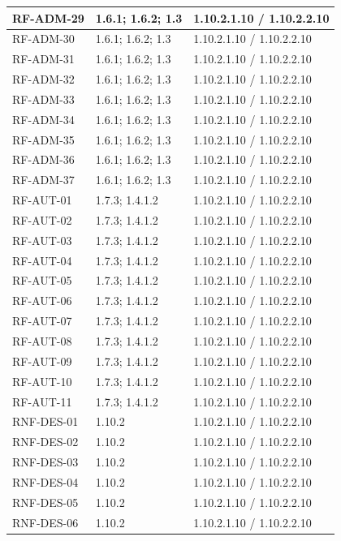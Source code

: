 \begin{longtable}{L{23mm}L{46mm}L{72mm}}
RF-ADM-29 & 1.6.1; 1.6.2; 1.3 & 1.10.2.1.10 / 1.10.2.2.10\\\hline
RF-ADM-30 & 1.6.1; 1.6.2; 1.3 & 1.10.2.1.10 / 1.10.2.2.10\\\hline
RF-ADM-31 & 1.6.1; 1.6.2; 1.3 & 1.10.2.1.10 / 1.10.2.2.10\\\hline
RF-ADM-32 & 1.6.1; 1.6.2; 1.3 & 1.10.2.1.10 / 1.10.2.2.10\\\hline
RF-ADM-33 & 1.6.1; 1.6.2; 1.3 & 1.10.2.1.10 / 1.10.2.2.10\\\hline
RF-ADM-34 & 1.6.1; 1.6.2; 1.3 & 1.10.2.1.10 / 1.10.2.2.10\\\hline
RF-ADM-35 & 1.6.1; 1.6.2; 1.3 & 1.10.2.1.10 / 1.10.2.2.10\\\hline
RF-ADM-36 & 1.6.1; 1.6.2; 1.3 & 1.10.2.1.10 / 1.10.2.2.10\\\hline
RF-ADM-37 & 1.6.1; 1.6.2; 1.3 & 1.10.2.1.10 / 1.10.2.2.10\\\hline
RF-AUT-01 & 1.7.3; 1.4.1.2 & 1.10.2.1.10 / 1.10.2.2.10\\\hline
RF-AUT-02 & 1.7.3; 1.4.1.2 & 1.10.2.1.10 / 1.10.2.2.10\\\hline
RF-AUT-03 & 1.7.3; 1.4.1.2 & 1.10.2.1.10 / 1.10.2.2.10\\\hline
RF-AUT-04 & 1.7.3; 1.4.1.2 & 1.10.2.1.10 / 1.10.2.2.10\\\hline
RF-AUT-05 & 1.7.3; 1.4.1.2 & 1.10.2.1.10 / 1.10.2.2.10\\\hline
RF-AUT-06 & 1.7.3; 1.4.1.2 & 1.10.2.1.10 / 1.10.2.2.10\\\hline
RF-AUT-07 & 1.7.3; 1.4.1.2 & 1.10.2.1.10 / 1.10.2.2.10\\\hline
RF-AUT-08 & 1.7.3; 1.4.1.2 & 1.10.2.1.10 / 1.10.2.2.10\\\hline
RF-AUT-09 & 1.7.3; 1.4.1.2 & 1.10.2.1.10 / 1.10.2.2.10\\\hline
RF-AUT-10 & 1.7.3; 1.4.1.2 & 1.10.2.1.10 / 1.10.2.2.10\\\hline
RF-AUT-11 & 1.7.3; 1.4.1.2 & 1.10.2.1.10 / 1.10.2.2.10\\\hline
RNF-DES-01 & 1.10.2 & 1.10.2.1.10 / 1.10.2.2.10\\\hline
RNF-DES-02 & 1.10.2 & 1.10.2.1.10 / 1.10.2.2.10\\\hline
RNF-DES-03 & 1.10.2 & 1.10.2.1.10 / 1.10.2.2.10\\\hline
RNF-DES-04 & 1.10.2 & 1.10.2.1.10 / 1.10.2.2.10\\\hline
RNF-DES-05 & 1.10.2 & 1.10.2.1.10 / 1.10.2.2.10\\\hline
RNF-DES-06 & 1.10.2 & 1.10.2.1.10 / 1.10.2.2.10\\\hline

\end{longtable}
